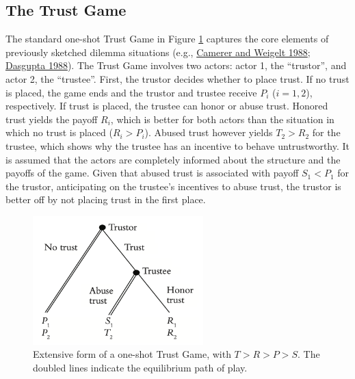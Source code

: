 \documentclass[
  11pt,
]{article}
\begin{document}
\hypertarget{the-trust-game}{%
\subsection{The Trust Game}\label{the-trust-game}}

The standard one-shot Trust Game in Figure \ref{fig:TG-graph} captures the core elements of previously sketched dilemma situations (e.g., \protect\hyperlink{ref-camerer_weigelt_sequential_1988}{Camerer and Weigelt 1988}; \protect\hyperlink{ref-dasgupta_1988}{Dasgupta 1988}).
The Trust Game involves two actors: actor 1, the ``trustor'', and actor 2, the ``trustee''.
First, the trustor decides whether to place trust.
If no trust is placed, the game ends and the trustor and trustee receive \(P_i\) (\(i = 1,2\)), respectively.
If trust is placed, the trustee can honor or abuse trust.
Honored trust yields the payoff \(R_i\), which is better for both actors than the situation in which no trust is placed (\(R_i > P_i\)).
Abused trust however yields \(T_2 > R_2\) for the trustee, which shows why the trustee has an incentive to behave untrustworthy.
It is assumed that the actors are completely informed about the structure and the payoffs of the game.
Given that abused trust is associated with payoff \(S_{1} < P_{1} %
\) for the trustor, anticipating on the trustee's incentives to abuse trust, the trustor is better off by not placing trust in the first place.

\begin{figure}[t]

{\centering \includegraphics[width=2.59in]{TG} 

}

\caption{Extensive form of a one-shot Trust Game, with $T > R > P > S$. The doubled lines indicate the equilibrium path of play.}\label{fig:TG-graph}
\end{figure}
\end{document}
